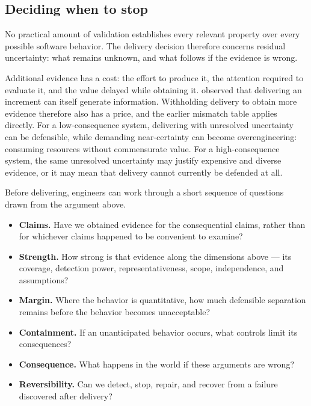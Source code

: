 \subsection{Deciding when to stop}\label{sec-when-to-stop}

No practical amount of validation establishes every relevant property over every possible software
behavior. The delivery decision therefore concerns residual uncertainty: what remains unknown, and
what follows if the evidence is wrong.

Additional evidence has a cost: the effort to produce it, the attention required to evaluate it,
and the value delayed while obtaining it. \citet{ch-process} observed that delivering an increment can
itself generate information. Withholding delivery to obtain more evidence therefore also has a
price, and the earlier mismatch table applies directly. For a low-consequence system, delivering
with unresolved uncertainty can be defensible, while demanding near-certainty can become
overengineering: consuming resources without commensurate value. For a high-consequence system, the
same unresolved uncertainty may justify expensive and diverse evidence, or it may mean that
delivery cannot currently be defended at all.

Before delivering, engineers can work through a short sequence of questions drawn from the argument
above.

\begin{itemize}
\tightlist
\item
  \textbf{Claims.} Have we obtained evidence for the consequential claims, rather than for whichever
  claims happened to be convenient to examine?
\item
  \textbf{Strength.} How strong is that evidence along the dimensions above --- its coverage, detection
  power, representativeness, scope, independence, and assumptions?
\item
  \textbf{Margin.} Where the behavior is quantitative, how much defensible separation remains before
  the behavior becomes unacceptable?
\item
  \textbf{Containment.} If an unanticipated behavior occurs, what controls limit its consequences?
\item
  \textbf{Consequence.} What happens in the world if these arguments are wrong?
\item
  \textbf{Reversibility.} Can we detect, stop, repair, and recover from a failure discovered after
  delivery?
\end{itemize}

